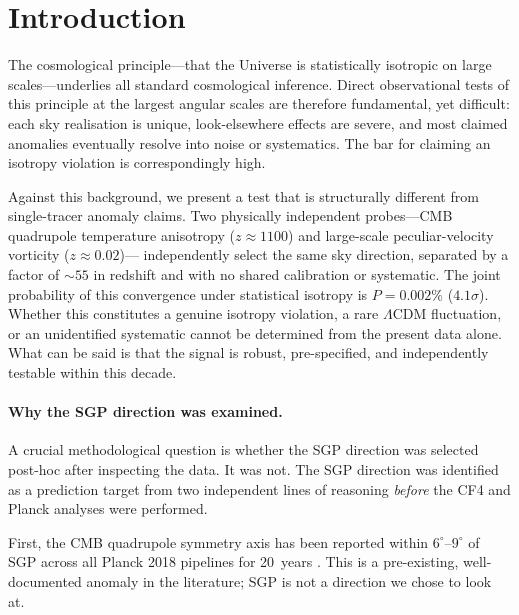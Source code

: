\documentclass[12pt]{article}
\begin{document}
\section{Introduction}

The cosmological principle---that the Universe is statistically isotropic on
large scales---underlies all standard cosmological inference.
Direct observational tests of this principle at the largest angular scales
are therefore fundamental, yet difficult: each sky realisation is unique,
look-elsewhere effects are severe, and most claimed anomalies eventually
resolve into noise or systematics.
The bar for claiming an isotropy violation is correspondingly high.

Against this background, we present a test that is structurally different
from single-tracer anomaly claims.
Two physically independent probes---CMB quadrupole temperature anisotropy
($z\approx1100$) and large-scale peculiar-velocity vorticity ($z\approx0.02$)---
independently select the same sky direction, separated by a factor of $\sim55$
in redshift and with no shared calibration or systematic.
The joint probability of this convergence under statistical isotropy is
$P=0.002\%$ ($4.1\sigma$).
Whether this constitutes a genuine isotropy violation, a rare $\Lambda$CDM
fluctuation, or an unidentified systematic cannot be determined from the
present data alone.
What can be said is that the signal is robust, pre-specified, and
independently testable within this decade.

\paragraph{Why the SGP direction was examined.}
A crucial methodological question is whether the SGP direction was selected
post-hoc after inspecting the data.
It was not. The SGP direction was identified as a prediction target from two
independent lines of reasoning \emph{before} the CF4 and Planck analyses were
performed.

First, the CMB quadrupole symmetry axis has been reported within $6^\circ$--$9^\circ$
of SGP across all Planck 2018 pipelines for 20~years
\citep{deOliveiraCosta2004, Land2005, Schwarz2004, Schwarz2016,
Copi2006, Copi2010, Copi2015, Planck2016anom}.
This is a pre-existing, well-documented anomaly in the literature; SGP is not
a direction we chose to look at.
\end{document}
